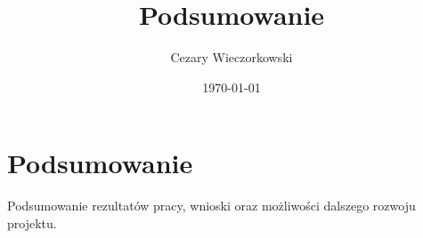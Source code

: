 \documentclass[../main.tex]{subfiles}
\author{Cezary Wieczorkowski}
\date{\today}
\title{Podsumowanie}
\begin{document}
\section{Podsumowanie}

Podsumowanie rezultatów pracy, wnioski oraz możliwości dalszego rozwoju projektu.
\end{document}
